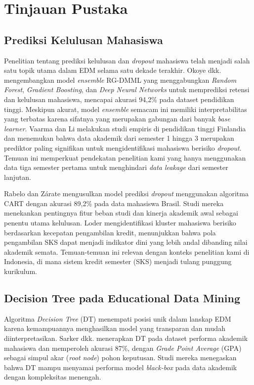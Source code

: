 \documentclass{ieeeaccess}
\begin{document}
\section{Tinjauan Pustaka}
\label{sec:related}

\subsection{Prediksi Kelulusan Mahasiswa}
Penelitian tentang prediksi kelulusan dan \emph{dropout} mahasiswa telah menjadi salah satu topik utama dalam EDM selama satu dekade terakhir. Okoye dkk. \cite{ref3} mengembangkan model \emph{ensemble} RG-DMML yang menggabungkan \emph{Random Forest}, \emph{Gradient Boosting}, dan \emph{Deep Neural Networks} untuk memprediksi retensi dan kelulusan mahasiswa, mencapai akurasi 94,2\% pada dataset pendidikan tinggi. Meskipun akurat, model \emph{ensemble} semacam ini memiliki interpretabilitas yang terbatas karena sifatnya yang merupakan gabungan dari banyak \emph{base learner}. Vaarma dan Li \cite{ref6} melakukan studi empiris di pendidikan tinggi Finlandia dan menemukan bahwa data akademik dari semester 1 hingga 3 merupakan prediktor paling signifikan untuk mengidentifikasi mahasiswa berisiko \emph{dropout}. Temuan ini memperkuat pendekatan penelitian kami yang hanya menggunakan data tiga semester pertama untuk menghindari \emph{data leakage} dari semester lanjutan.

Rabelo dan Z\'arate \cite{ref7} mengusulkan model prediksi \emph{dropout} menggunakan algoritma CART dengan akurasi 89,2\% pada data mahasiswa Brasil. Studi mereka menekankan pentingnya fitur beban studi dan kinerja akademik awal sebagai penentu utama kelulusan. Loder \cite{ref8} mengidentifikasi kluster mahasiswa berisiko berdasarkan kecepatan pengambilan kredit, menunjukkan bahwa pola pengambilan SKS dapat menjadi indikator dini yang lebih andal dibanding nilai akademik semata. Temuan-temuan ini relevan dengan konteks penelitian kami di Indonesia, di mana sistem kredit semester (SKS) menjadi tulang punggung kurikulum.

\subsection{Decision Tree pada Educational Data Mining}
Algoritma \emph{Decision Tree} (DT) menempati posisi unik dalam lanskap EDM karena kemampuannya menghasilkan model yang transparan dan mudah diinterpretasikan. Sarker dkk. \cite{ref4} menerapkan DT pada dataset performa akademik mahasiswa dan memperoleh akurasi 87\%, dengan \emph{Grade Point Average} (GPA) sebagai simpul akar (\emph{root node}) pohon keputusan. Studi mereka menegaskan bahwa DT mampu menyamai performa model \emph{black-box} pada data akademik dengan kompleksitas menengah.
\end{document}

